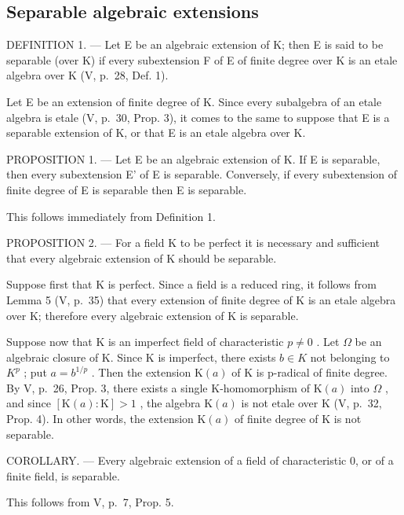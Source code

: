 \subsection{Separable algebraic extensions}

DEFINITION 1. --- Let E be an algebraic extension of K; then E is said to be separable (over K) if every subextension F of E of finite degree over K is an etale algebra over K (V, p.~28, Def. 1).

Let E be an extension of finite degree of K. Since every subalgebra of an etale algebra is etale (V, p.~30, Prop. 3), it comes to the same to suppose that E is a separable extension of K, or that E is an etale algebra over K.

PROPOSITION 1. --- Let E be an algebraic extension of K. If E is separable, then every subextension E' of E is separable. Conversely, if every subextension of finite degree of E is separable then E is separable.

This follows immediately from Definition 1.

PROPOSITION 2. --- For a field K to be perfect it is necessary and sufficient that every algebraic extension of K should be separable.

Suppose first that K is perfect. Since a field is a reduced ring, it follows from Lemma 5 (V, p.~35) that every extension of finite degree of K is an etale algebra over K; therefore every algebraic extension of K is separable.

Suppose now that K is an imperfect field of characteristic \(p \neq 0\) . Let \(\Omega\) be an algebraic closure of K. Since K is imperfect, there exists \(b \in K\) not belonging to \(K^{p}\) ; put \(a = b^{1/p}\) . Then the extension \(\mathrm{K}(a)\) of K is p-radical of finite degree. By V, p.~26, Prop. 3, there exists a single K-homomorphism of \(\mathrm{K}(a)\) into \(\Omega\) , and since \([\mathrm{K}(a):\mathrm{K}] > 1\) , the algebra \(\mathrm{K}(a)\) is not etale over K (V, p.~32, Prop. 4). In other words, the extension \(\mathrm{K}(a)\) of finite degree of K is not separable.

COROLLARY. --- Every algebraic extension of a field of characteristic 0, or of a finite field, is separable.

This follows from V, p.~7, Prop. 5.

